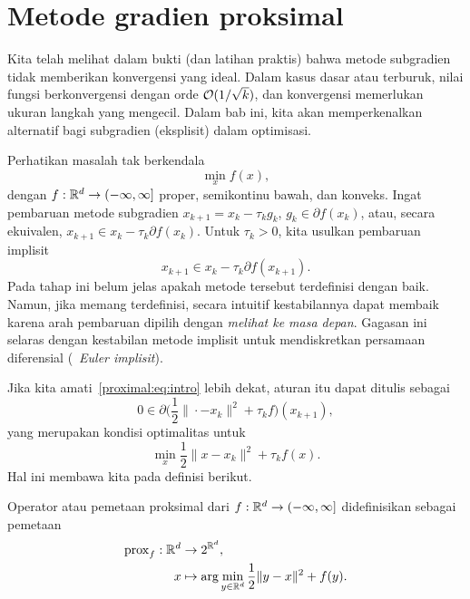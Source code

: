 \chapter{Metode gradien proksimal}

Kita telah melihat dalam bukti (dan latihan praktis) bahwa metode subgradien tidak memberikan konvergensi yang ideal. Dalam kasus dasar atau terburuk, nilai fungsi berkonvergensi dengan orde \(\mathcal{O}(1/\sqrt{k})\), dan konvergensi memerlukan ukuran langkah yang mengecil. Dalam bab ini, kita akan memperkenalkan alternatif bagi subgradien (eksplisit) dalam optimisasi.

Perhatikan masalah tak berkendala
\begin{equation}\label{proximal:eq:problem}
    \min_x f(x),
\end{equation}
dengan \(f:\mathbb{R}^d\rightarrow(-\infty,\infty]\) proper, semikontinu bawah, dan konveks. Ingat pembaruan metode subgradien \(x_{k+1}=x_k-\tau_k g_k\), \(g_k\in\partial f(x_k)\), atau, secara ekuivalen, \(x_{k+1}\in x_k-\tau_k\partial f(x_k)\). Untuk \(\tau_k>0\), kita usulkan pembaruan implisit
\begin{equation}\label{proximal:eq:intro}
    x_{k+1}\in x_k-\tau_k\partial f(x_{k+1}).
\end{equation}
Pada tahap ini belum jelas apakah metode tersebut terdefinisi dengan baik. Namun, jika memang terdefinisi, secara intuitif kestabilannya dapat membaik karena arah pembaruan dipilih dengan \emph{melihat ke masa depan}. Gagasan ini selaras dengan kestabilan metode implisit untuk mendiskretkan persamaan diferensial (\cf~\emph{Euler implisit}).

Jika kita amati~\eqref{proximal:eq:intro} lebih dekat, aturan itu dapat ditulis sebagai
\begin{equation}
    0\in\partial\biggl(\frac{1}{2}\|\cdot-x_k\|^2+\tau_k f\biggr)(x_{k+1}),
\end{equation}
yang merupakan kondisi optimalitas untuk
\begin{equation}
    \min_x\frac{1}{2}\|x-x_k\|^2+\tau_k f(x).
\end{equation}
Hal ini membawa kita pada definisi berikut.
\begin{defn}
    Operator atau pemetaan proksimal dari \(f:\mathbb{R}^d\rightarrow(-\infty,\infty]\) didefinisikan sebagai pemetaan
    \begin{equation}
        \begin{aligned}
            \mathrm{prox}_f:\mathbb{R}^d&\rightarrow 2^{\mathbb{R}^d},\\
            x&\mapsto\arg\min_{y\in\mathbb{R}^d}\frac{1}{2}\|y-x\|^2+f(y).
        \end{aligned}
    \end{equation}
\end{defn}

